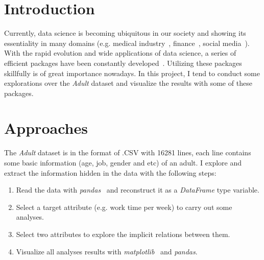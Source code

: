 \documentclass[12pt,a4paper]{article}
\theoremstyle{definition}
\begin{document}
\noindent
\noindent{}
\vspace{-1.5\baselineskip}

\renewcommand{\figurename}{Figure}
\section{Introduction} %

Currently, data science is becoming ubiquitous in our society and showing its essentiality in many domains (e.g. medical industry~\cite{medical1, medical2}, finance~\cite{finance}, social media~\cite{media1, media2}). With the rapid evolution and wide applications of data science, a series of efficient packages have been constantly developed~\cite{numpy, pandas, matplotlib, sklearn}. Utilizing these packages skillfully is of great importance nowadays. In this project, I tend to conduct some explorations over the \textit{Adult} dataset and visualize the results with some of these packages.

\section{Approaches}

The \textit{Adult} dataset is in the format of .CSV with 16281 lines, each line contains some basic information (age, job, gender and etc) of an adult. I explore and extract the information hidden in the data with the following steps:

\begin{enumerate}
\item Read the data with \textit{pandas}~\cite{pandas} and reconstruct it as a \textit{DataFrame} type variable.

\item Select a target attribute (e.g. work time per week) to carry out some analyses.

\item Select two attributes to explore the implicit relations between them.

\item Visualize all analyses results with \textit{matplotlib}~\cite{matplotlib} and \textit{pandas}.
\end{enumerate}
\end{document}

